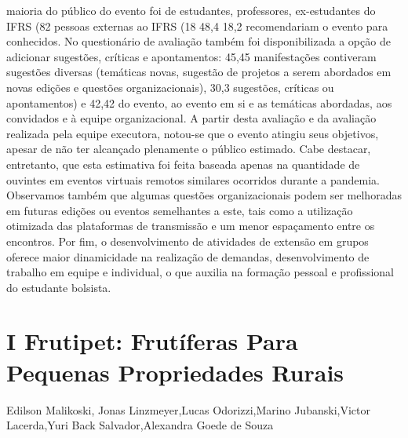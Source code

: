 maioria do público do evento foi de estudantes, professores, ex-estudantes do IFRS (82%
pessoas externas ao IFRS (18%
48,4%
18,2%
recomendariam o evento para conhecidos. No questionário de avaliação também foi
disponibilizada a opção de adicionar sugestões, críticas e apontamentos: 45,45%
manifestações contiveram sugestões diversas (temáticas novas, sugestão de projetos a serem
abordados em novas edições e questões organizacionais), 30,3%
sugestões, críticas ou apontamentos) e 42,42%
do evento, ao evento em si e as temáticas abordadas, aos convidados e à equipe organizacional.
A partir desta avaliação e da avaliação realizada pela equipe executora, notou-se que o evento
atingiu seus objetivos, apesar de não ter alcançado plenamente o público estimado. Cabe
destacar, entretanto, que esta estimativa foi feita baseada apenas na quantidade de ouvintes em
eventos virtuais remotos similares ocorridos durante a pandemia. Observamos também que
algumas questões organizacionais podem ser melhoradas em futuras edições ou eventos
semelhantes a este, tais como a utilização otimizada das plataformas de transmissão e um menor
espaçamento entre os encontros. Por fim, o desenvolvimento de atividades de extensão em
grupos oferece maior dinamicidade na realização de demandas, desenvolvimento de trabalho em
equipe e individual, o que auxilia na formação pessoal e profissional do estudante bolsista.




\section*{I Frutipet: Frutíferas Para Pequenas Propriedades Rurais}

Edilson Malikoski, Jonas Linzmeyer,Lucas Odorizzi,Marino Jubanski,Victor Lacerda,Yuri Back Salvador,Alexandra Goede de Souza

